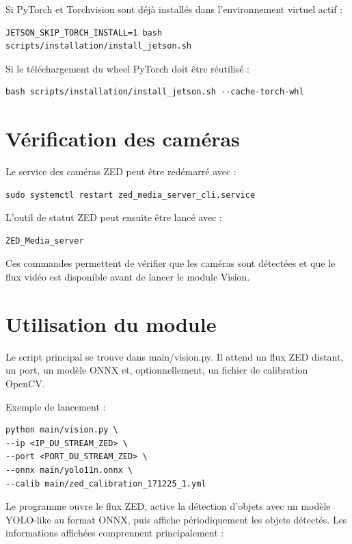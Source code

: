 \documentclass[11pt,letterpaper]{article}
\begin{document}
Si PyTorch et Torchvision sont déjà installés dans l’environnement virtuel actif :

\begin{verbatim}
JETSON_SKIP_TORCH_INSTALL=1 bash scripts/installation/install_jetson.sh
\end{verbatim}

Si le téléchargement du wheel PyTorch doit être réutilisé :

\begin{verbatim}
bash scripts/installation/install_jetson.sh --cache-torch-whl
\end{verbatim}

\section{Vérification des caméras}

Le service des caméras ZED peut être redémarré avec :

\begin{verbatim}
sudo systemctl restart zed_media_server_cli.service
\end{verbatim}

L’outil de statut ZED peut ensuite être lancé avec :

\begin{verbatim}
ZED_Media_server
\end{verbatim}

Ces commandes permettent de vérifier que les caméras sont détectées et que le flux vidéo est disponible avant de lancer le module Vision.

\section{Utilisation du module}

Le script principal se trouve dans main/vision.py. Il attend un flux ZED distant, un port, un modèle ONNX et, optionnellement, un fichier de calibration OpenCV.

Exemple de lancement :

\begin{verbatim}
python main/vision.py \
--ip <IP_DU_STREAM_ZED> \
--port <PORT_DU_STREAM_ZED> \
--onnx main/yolo11n.onnx \
--calib main/zed_calibration_171225_1.yml
\end{verbatim}

Le programme ouvre le flux ZED, active la détection d’objets avec un modèle YOLO-like au format ONNX, puis affiche périodiquement les objets détectés. Les informations affichées comprennent principalement :
\end{document}
